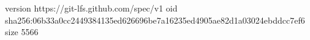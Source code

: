 version https://git-lfs.github.com/spec/v1
oid sha256:06b33a0cc2449384135ed626696be7a16235ed4905ae82d1a03024ebddcc7ef6
size 5566
